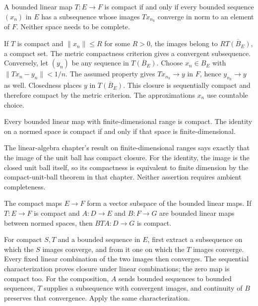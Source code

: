 \begin{proposition}
\label{prop:compact_operator_sequences}
A bounded linear map $T:E\to F$ is compact if and only if every
bounded sequence $(x_n)$ in $E$ has a subsequence whose images
$Tx_{n_k}$ converge in norm to an element of $F$.
Neither space needs to be complete.
\end{proposition}
\Proof
If $T$ is compact and $\|x_n\|\leq R$ for some $R>0$, the images
belong to $R\overline{T(B_E)}$, a compact set. The metric compactness
criterion gives a convergent subsequence.
Conversely, let $(y_n)$ be any sequence in $\overline{T(B_E)}$.
Choose $x_n\in B_E$ with $\|Tx_n-y_n\|<1/n$. The assumed property
gives $Tx_{n_k}\to y$ in $F$, hence $y_{n_k}\to y$ as well.
Closedness places $y$ in $\overline{T(B_E)}$. This closure is
sequentially compact and therefore compact by the metric criterion.
The approximations $x_n$ use countable choice.
\Done

\begin{corollary}
Every bounded linear map with finite-dimensional range is compact.
The identity on a normed space is compact if and only if that space
is finite-dimensional.
\end{corollary}
\Proof
The linear-algebra chapter's result on finite-dimensional ranges says
exactly that the image of the unit ball has compact closure. For the
identity, the image is the closed unit ball itself, so its compactness
is equivalent to finite dimension by the compact-unit-ball theorem
in that chapter. Neither assertion requires ambient completeness.
\Done

\begin{proposition}
The compact maps $E\to F$ form a vector subspace of the bounded
linear maps. If $T:E\to F$ is compact and $A:D\to E$ and
$B:F\to G$ are bounded linear maps between normed spaces, then
$BTA:D\to G$ is compact.
\end{proposition}
\Proof
For compact $S,T$ and a bounded sequence in $E$, first extract a
subsequence on which the $S$ images converge, and from it one on
which the $T$ images converge. Every fixed linear combination of
the two images then converges. The sequential characterization proves
closure under linear combinations; the zero map is compact too.
For the composition, $A$ sends bounded sequences to bounded sequences,
$T$ supplies a subsequence with convergent images, and continuity of
$B$ preserves that convergence. Apply the same characterization.
\Done

